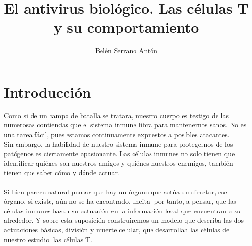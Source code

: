 \documentclass{article}
\title{	\xout{¿Cómo nos defendemos de los patógenos?} El antivirus biológico. Las células T y su comportamiento}
\author{Belén Serrano Antón }
\begin{document}
	
	\begin{titlepage}
		\maketitle
	\end{titlepage}


	\tableofcontents
	
	\newpage
	
	\section{Introducción}
	
	Como si de un campo de batalla se tratara, nuestro cuerpo es testigo de las numerosas contiendas que el sistema inmune libra para mantenernos sanos. No es una tarea fácil, pues estamos continuamente expuestos a posibles atacantes.
	\\
	Sin embargo, la habilidad de nuestro sistema inmune para protegernos de los patógenos es ciertamente apasionante. Las células inmunes no solo tienen que identificar quiénes son nuestros amigos y quiénes nuestros enemigos, también tienen que saber cómo y dónde actuar.
	\\
	\\
	Si bien parece natural pensar que hay un órgano que actúa de director, ese órgano, si existe, aún no se ha encontrado. Incita, por tanto, a pensar, que las células inmunes basan su actuación en la información local que encuentran a su alrededor. Y sobre esta suposición construiremos un modelo que describa las dos actuaciones básicas, división y muerte celular, que desarrollan las células de nuestro estudio: las células T.
	
\end{document}
